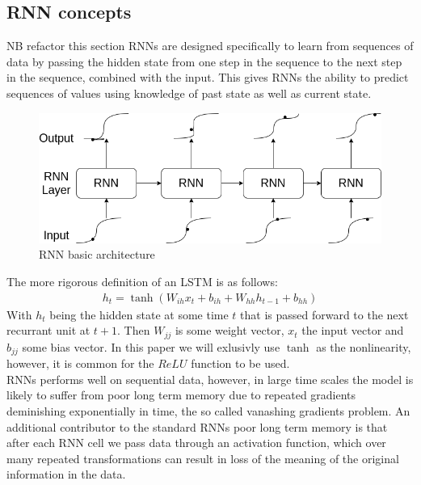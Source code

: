 \documentclass{article}
\begin{document}
\subsection{RNN concepts}
\label{sec:RNNS}
NB refactor this section
RNNs are designed specifically to learn from sequences of data by passing the hidden state from one step in the sequence to the next step in the sequence, combined with the input. This gives RNNs the ability to predict sequences of values using knowledge of past state as well as current state. 
\begin{figure}[H]
\caption{RNN basic architecture}
\label{fig:RNN}
\includegraphics[scale=0.5]{RNN.png}
\end{figure}
The more rigorous definition of an LSTM is as follows:
\begin{align*}
h_t = \tanh\left( W_{ih}x_t + b_{ih} + W_{hh}h_{t-1} + b_{hh}  \right)
\end{align*}
With $h_t$ being the hidden state at some time $t$ that is passed forward to the next recurrant unit at $t+1$. Then $W_{jj}$ is some weight vector, $x_t$ the input vector and $b_{jj}$ some bias vector. In this paper we will exlusivly use $\tanh$ as the nonlinearity, however, it is common for the $ReLU$ function to be used. \\
RNNs performs well on sequential data, however, in large time scales the model is likely to suffer from poor long term memory due to repeated gradients deminishing exponentially in time, the so called vanashing gradients problem. An additional contributor to the standard RNNs poor long term memory is that after each RNN cell we pass data through an activation function, which over many repeated transformations can result in loss of the meaning of the original information in the data. 
\end{document}
